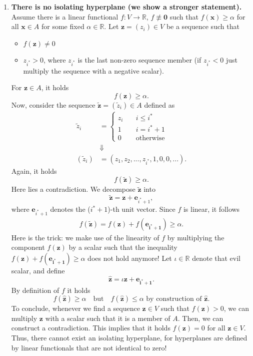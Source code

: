 \documentclass{article}
\begin{document}
\begin{enumerate}
    \item \textbf{There is no isolating hyperplane (we show a stronger statement).} Assume there is a linear functional $f: V \to \mathbb{R}$, $f \not \equiv \mathbf 0$ such that $f(\mathbf x) \geq \alpha$ for all $\mathbf x \in A$ for some fixed $\alpha \in \mathbb{R}$. Let $\mathbf z = (z_i) \in V$ be a sequence such that 
    \begin{itemize}
        \item $f(\mathbf z) \neq 0$
        \item $z_{i^*} > 0$, where $z_{i^*}$ is the last non-zero sequence member (if $z_{i^*} < 0$ just multiply the sequence with a negative scalar).
    \end{itemize}
    For $\mathbf z \in A$, it holds 
    $$
        f(\mathbf z) \geq \alpha.
    $$
    Now, consider the sequence $\mathbf{\tilde z}=(\tilde z_i) \in A$ defined as 
    \begin{align*}
        \tilde z_i &= \begin{cases}
            z_i \quad & i \leq i^* \\
            1 \quad & i = i^* + 1\\
            0 & \text{otherwise}
        \end{cases}\\  
        &\Downarrow \\
        (\tilde z_i) &= \left(z_1,z_2,...,z_{i^*},1,0,0,...\right).
    \end{align*}
    Again, it holds 
    $$
        f(\mathbf{\tilde z}) \geq \alpha.
    $$
    Here lies a contradiction. We decompose $\mathbf{\tilde z}$ into 
    $$
        \mathbf{\tilde z} = \mathbf z + \mathbf e_{i^*+1},
    $$
    where $\mathbf e_{i^*+1}$ denotes the ($i^*+1$)-th unit vector. Since $f$ is linear, it follows 
    \begin{align*}
        f(\mathbf{\tilde z}) = f(\mathbf{z}) + f(\mathbf{e_{i^* + 1}}) \geq \alpha.
    \end{align*}
    Here is the trick: we make use of the linearity of $f$ by multiplying the component $f(\mathbf{z})$ by a scalar such that the inequality $f(\mathbf{z}) + f(\mathbf{e_{i^* + 1}}) \geq \alpha$ does not hold anymore! Let $\iota \in \mathbb{R}$ denote that evil scalar, and define 
    $$
        \hat{\mathbf z} = \iota \mathbf{z} + \mathbf{e_{i^* + 1}}.
    $$
    By definition of $f$ it holds 
    $$
        f(\hat{\mathbf{z}}) \geq \alpha \quad \text{but} \quad f(\hat{\mathbf{z}}) \leq \alpha \text{ by construction of $\hat{\mathbf{z}}$}. 
    $$
    To conclude, whenever we find a sequence $\mathbf{z} \in V$ such that $f(\mathbf{z}) > 0$, we can multiply $\mathbf z$ with a scalar such that it is a member of $A$. Then, we can construct a contradiction. This implies that it holds $f(\mathbf z) = 0$ for all $\mathbf z \in V$. Thus, there cannot exist an isolating hyperplane, for hyperplanes are defined by linear functionals that are not identical to zero!


\end{enumerate}
\end{document}
